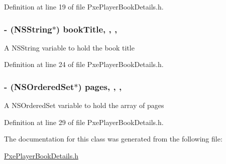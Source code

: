 Definition at line 19 of file Pxe\-Player\-Book\-Details.\-h.

\hypertarget{interface_pxe_player_book_details_a34d0ade8fbd6a3bbe7cba760dec26d8c}{
\subsubsection[{book\-Title}]{\setlength{\rightskip}{0pt plus 5cm}-\/ (N\-S\-String$\ast$) book\-Title\hspace{0.3cm}{\ttfamily [read]}, {\ttfamily [write]}, {\ttfamily [nonatomic]}, {\ttfamily [retain]}}}\label{interface_pxe_player_book_details_a34d0ade8fbd6a3bbe7cba760dec26d8c}
A N\-S\-String variable to hold the book title 

Definition at line 24 of file Pxe\-Player\-Book\-Details.\-h.

\hypertarget{interface_pxe_player_book_details_a6da96231ab61dc6eed9e7856ebded73c}{
\subsubsection[{pages}]{\setlength{\rightskip}{0pt plus 5cm}-\/ (N\-S\-Ordered\-Set$\ast$) pages\hspace{0.3cm}{\ttfamily [read]}, {\ttfamily [write]}, {\ttfamily [nonatomic]}, {\ttfamily [retain]}}}\label{interface_pxe_player_book_details_a6da96231ab61dc6eed9e7856ebded73c}
A N\-S\-Ordered\-Set variable to hold the array of pages 

Definition at line 29 of file Pxe\-Player\-Book\-Details.\-h.



The documentation for this class was generated from the following file\-:\begin{DoxyCompactItemize}
\item 
\hyperlink{_pxe_player_book_details_8h}{Pxe\-Player\-Book\-Details.\-h}\end{DoxyCompactItemize}
